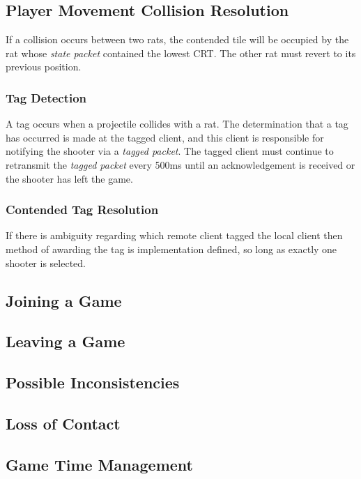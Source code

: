 \documentclass{article}
\begin{document}
\subsection{Player Movement Collision Resolution}
If a collision occurs between two rats, the contended tile will be
occupied by the rat whose \textit{state packet} contained the lowest CRT. The
other rat must revert to its previous position.

\subsubsection{Tag Detection}
\label{ssec:tagging}
A tag occurs when a projectile collides with a rat. The determination
that a tag has occurred is made at the tagged client, and this client is
responsible for notifying the shooter via a \textit{tagged packet}.
The tagged client must continue to retransmit the \textit{tagged packet}
every 500ms until an acknowledgement is received or the shooter has left
the game.

\subsubsection{Contended Tag Resolution}
If there is ambiguity regarding which remote client tagged the local
client then method of awarding the tag is implementation defined, so
long as exactly one shooter is selected.

\subsection{Joining a Game}
\subsection{Leaving a Game}
\subsection{Possible Inconsistencies}
\subsection{Loss of Contact}
\subsection{Game Time Management}
\label{ssec:timestamp}
\end{document}
